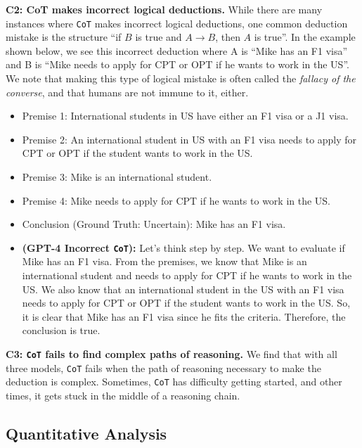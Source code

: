 \documentclass[11pt]{article}
\begin{document}
\textbf{C2: CoT makes incorrect logical deductions.} While there are many instances where \texttt{CoT} makes incorrect logical deductions, one common deduction mistake is the structure ``if $B$ is true and $A \rightarrow B$, then $A$ is true''. In the example shown below, we see this incorrect deduction where A is ``Mike has an F1 visa'' and B is ``Mike needs to apply for CPT or OPT if he wants to work in the US''. We note that making this type of logical mistake is often called the \emph{fallacy of the converse}, and that humans are not immune to it, either.

\begin{itemize}
\itemsep0.1em
    \item[] \small Premise 1: International students in US have either an F1 visa or a J1 visa.
    \item[] \small Premise 2: An international student in US with an F1 visa needs to apply for CPT or OPT if the student wants to work in the US.
    \item[] \small Premise 3: Mike is an international student.
    \item[] \small Premise 4: Mike needs to apply for CPT if he wants to work in the US.
    \item[] \small Conclusion (Ground Truth: Uncertain): Mike has an F1 visa.
    \item[] \small \textbf{(GPT-4 Incorrect \texttt{CoT}):} Let's think step by step. We want to evaluate if Mike has an F1 visa. From the premises, we know that Mike is an international student and needs to apply for CPT if he wants to work in the US. We also know that an international student in the US with an F1 visa needs to apply for CPT or OPT if the student wants to work in the US. So, it is clear that Mike has an F1 visa since he fits the criteria. Therefore, the conclusion is true.
\end{itemize}

\textbf{C3: \texttt{CoT} fails to find complex paths of reasoning.} We find that with all three models, \texttt{CoT} fails when the path of reasoning necessary to make the deduction is complex. Sometimes, \texttt{CoT} has difficulty getting started, and other times, it gets stuck in the middle of a reasoning chain.

\subsection{Quantitative Analysis}
\end{document}
